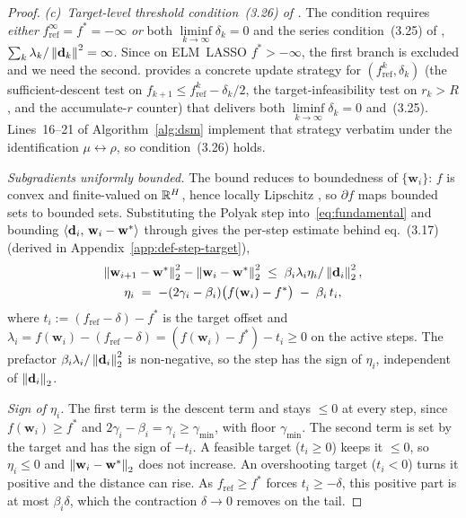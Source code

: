 \begin{proof}
\emph{(c)~Target-level threshold condition~(3.26) of \cite{dantonio2009deflected}.} The condition requires \emph{either} $f^\infty_{\mathrm{ref}} = f^* = -\infty$ \emph{or} both $\liminf\limits_{k\to\infty} \delta_k = 0$ and the series condition~(3.25) of \cite{dantonio2009deflected}, $\sum_k \lambda_k/\left\lVert \mathbf{d}_k \right\rVert^2 = \infty$. Since on ELM~LASSO $f^* > -\infty$, the first branch is excluded and we need the second. \cite[Lemma~3.8]{dantonio2009deflected} provides a concrete update strategy for $(f^k_{\mathrm{ref}}, \delta_k)$ (the sufficient-descent test on $f_{k+1} \le f^k_{\mathrm{ref}} - \delta_k/2$, the target-infeasibility test on $r_k > R$, and the accumulate-$r$ counter) that delivers both $\liminf\limits_{k\to\infty} \delta_k = 0$ and~(3.25). Lines~16--21 of Algorithm~\ref{alg:dsm} implement that strategy verbatim under the identification $\mu \leftrightarrow \rho$, so condition~(3.26) holds.

\emph{Subgradients uniformly bounded.} The bound reduces to boundedness of $\{\mathbf{w}_i\}$: $f$ is convex and finite-valued on $\mathbb{R}^H$, hence locally Lipschitz \cite[Slide 9]{frangioni-slides-smooth}, so $\partial f$ maps bounded sets to bounded sets. Substituting the Polyak step into~\eqref{eq:fundamental} and bounding $\left\langle \mathbf{d}_i,\, \mathbf{w}_i-\mathbf{w}^* \right\rangle$ through \cite[Corollary~3.2]{dantonio2009deflected} gives the per-step estimate behind eq.~(3.17) (derived in Appendix~\ref{app:def-step-target}),
\begin{gather*}
\left\lVert \mathbf{w}_{i+1}-\mathbf{w}^* \right\rVert_2^2 - \left\lVert \mathbf{w}_i-\mathbf{w}^* \right\rVert_2^2 \;\le\; \beta_i\lambda_i\eta_i/\left\lVert \mathbf{d}_i \right\rVert_2^2,\\
\eta_i \;=\; -(2\gamma_i-\beta_i)\big(f(\mathbf{w}_i)-f^*\big)\;-\;\beta_i\, t_i,
\end{gather*}
where $t_i := (f_{\mathrm{ref}}-\delta) - f^*$ is the target offset and $\lambda_i = f(\mathbf{w}_i)-(f_{\mathrm{ref}}-\delta) = (f(\mathbf{w}_i)-f^*) - t_i \ge 0$ on the active steps. The prefactor $\beta_i\lambda_i/\left\lVert \mathbf{d}_i \right\rVert_2^2$ is non-negative, so the step has the sign of $\eta_i$, independent of $\left\lVert \mathbf{d}_i \right\rVert_2$.

\emph{Sign of $\eta_i$.} The first term is the descent term and stays $\le 0$ at every step, since $f(\mathbf{w}_i)\ge f^*$ and $2\gamma_i-\beta_i=\gamma_i\ge\gamma_{\min}$, with floor $\gamma_{\min}$. The second term is set by the target and has the sign of $-t_i$. A feasible target ($t_i\ge 0$) keeps it $\le 0$, so $\eta_i\le 0$ and $\left\lVert \mathbf{w}_i-\mathbf{w}^* \right\rVert_2$ does not increase. An overshooting target ($t_i<0$) turns it positive and the distance can rise. As $f_{\mathrm{ref}}\ge f^*$ forces $t_i\ge-\delta$, this positive part is at most $\beta_i\delta$, which the contraction $\delta\to 0$ removes on the tail.


\end{proof}
